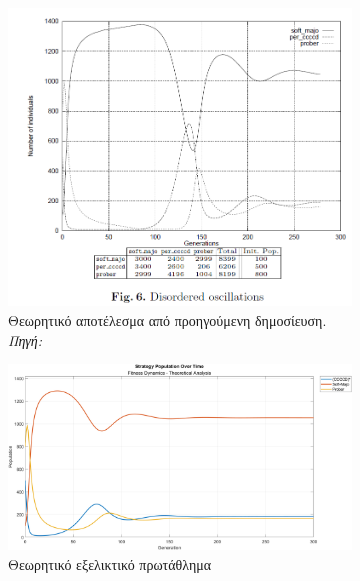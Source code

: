 \documentclass[12pt]{report}
\begin{document}
\begin{figure}[htbp]
    \centering

    \begin{subfigure}[b]{0.5\linewidth}
        \centering
        \includegraphics[width=\linewidth]{Figures Fitness Dynamics/6.png}
        \caption{Θεωρητικό αποτέλεσμα από προηγούμενη δημοσίευση. \textit{Πηγή:} \protect\cite{mathieu1999}}
        \label{fig:fig_fit_6_a}
    \end{subfigure}
    \hfill
    \begin{subfigure}[b]{0.5\linewidth}
        \centering
        \includegraphics[width=\linewidth]{Figures Fitness Dynamics/example6.png}
        \caption{Θεωρητικό εξελικτικό πρωτάθλημα}
        \label{fig:fig_fit_6_b}
    \end{subfigure}
    \hfill
    \begin{subfigure}[b]{0.5\linewidth}

\end{subfigure}
\end{figure}
\end{document}

